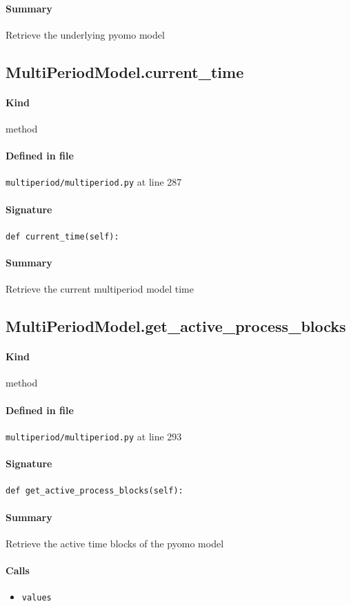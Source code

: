 \documentclass[11pt]{report}
\begin{document}
\paragraph{Summary} Retrieve the underlying pyomo model
\subsection{MultiPeriodModel.current\_time}
\label{def:multiperiod-multiperiod.py:MultiPeriodModel.current_time:L287}
\paragraph{Kind} method
\paragraph{Defined in file} \texttt{multiperiod/multiperiod.py} at line 287
\paragraph{Signature} \texttt{def current\_time(self):}
\paragraph{Summary} Retrieve the current multiperiod model time
\subsection{MultiPeriodModel.get\_active\_process\_blocks}
\label{def:multiperiod-multiperiod.py:MultiPeriodModel.get_active_process_blocks:L293}
\paragraph{Kind} method
\paragraph{Defined in file} \texttt{multiperiod/multiperiod.py} at line 293
\paragraph{Signature} \texttt{def get\_active\_process\_blocks(self):}
\paragraph{Summary} Retrieve the active time blocks of the pyomo model
\paragraph{Calls}
\begin{itemize}[leftmargin=*]
  \item \texttt{values}
\end{itemize}
\end{document}
